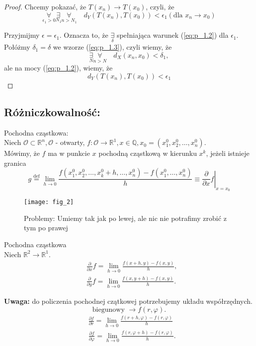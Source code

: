 \documentclass[../main.tex]{subfiles}
\begin{document}
\begin{proof}
Chcemy pokazać, że $T(x_n) \to T(x_0)$, czyli, że
    \[
        \underset{\epsilon_1 > 0}{\forall} \underset{N_1}{\exists} \underset{n>N_1}{\forall} \quad d_Y (T(x_n),T(x_0)) < \epsilon_1 (\text{dla } x_n \to x_0)
    \]

    Przyjmijmy $\epsilon=\epsilon_1$. Oznacza to, że $\underset{\delta}{\exists}$ spełniająca warunek (\ref{eq:p_1.2}) dla $\epsilon_1$. Połóżmy $\delta_1=\delta$ we wzorze (\ref{eq:p_1.3}), czyli wiemy, że
    \[
        \underset{N}{\exists} \underset{n>N}{\forall} \quad d_X(x_n, x_0) < \delta_1,
    \]
    ale na mocy (\ref{eq:p_1.2}), wiemy, że
    \[
        d_Y (T(x_n),T(x_0)) < \epsilon_1
    \]
\end{proof}

\pagebreak
\subsection{
    Różniczkowalność:
}

\begin{definicja}
    Pochodna cząstkowa:\\
    Niech $\mathcal{O}\subset\mathbb{R}^{n}, \mathcal{O}$ - otwarty,
    $f: \mathcal{O}\to\mathbb{R}^{1}, x\in\mathbb{Q}, x_0 = (x_1^0,x_2^0,\dots,x_n^0)$.\\
    Mówimy, że $f$ ma w punkcie $x$ pochodną cząstkową w kierunku $x^k$, jeżeli istnieje granica
    \[
        g \overset{\text{def}}{=} \lim\limits_{h \to 0}\frac{f(x_1^0, x_2^0, \dots, x_k^0 + h, \dots, x_n^0) - f(x_1^0,\dots,x_n^0)}{h} \equiv \left. \frac{\partial}{\partial x} f \right |_{x=x_0}
    \]
\end{definicja}

\begin{figure}
    \centering
    \texttt{[image: fig\_2]}
    \caption{Problemy: Umiemy tak jak po lewej, ale nic nie potrafimy zrobić z tym po prawej}
    \label{fig:fig_2}
\end{figure}

\begin{przyklad}
    Pochodna cząstkowa\\

    Niech $\mathbb{R}^{2}\to\mathbb{R}^{1}$.
    \begin{align*}
        &\frac{\partial}{\partial x} f = \lim\limits_{h \to 0}\frac{f(x+h,y) - f(x,y)}{h},\\
        &\frac{\partial}{\partial y} f = \lim\limits_{h \to 0}\frac{f(x,y+h) - f(x,y)}{h}
    .\end{align*}

    \textbf{Uwaga:} do policzenia pochodnej czątkowej potrzebujemy układu współrzędnych.
    \[
        \text{biegunowy } \to f(r,\varphi)
    .\]
\begin{align*}
    &\frac{\partial f}{\partial r} = \lim_{h \to 0} \frac{f(r+h, \varphi) - f(r,\varphi)}{h}\\
    &\frac{\partial f}{\partial \varphi} = \lim_{h \to 0} \frac{f(r, \varphi + h) - f(r,\varphi)}{h}
.\end{align*}

\end{przyklad}
\end{document}
